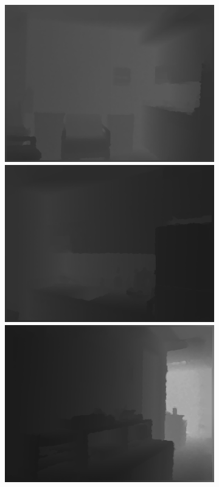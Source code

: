 \begin{figure}[htb]
\begin{subfigure}{0.24\linewidth}
\begin{minipage}[b]{1\linewidth}
    \includegraphics[width=1\linewidth]{figure/FAM/0.png}\vspace{4pt}
    \includegraphics[width=1\linewidth]{figure/FAM/1.png}\vspace{4pt}
    \includegraphics[width=1\linewidth]{figure/FAM/8.png}\vspace{4pt}

\end{minipage}
\end{subfigure}
\end{figure}
